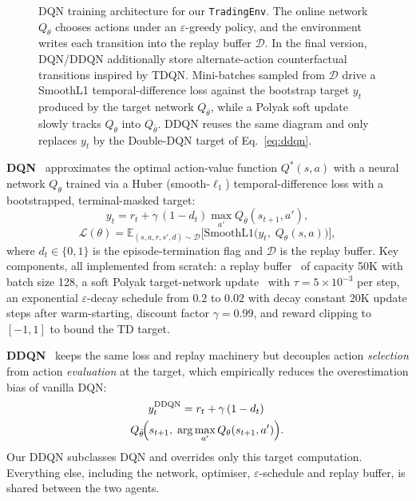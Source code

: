 \documentclass[11pt,twocolumn]{article}
\begin{document}
\begin{figure}[t]
\caption{DQN training architecture for our \texttt{TradingEnv}. The online network $Q_\theta$ chooses actions under an $\varepsilon$-greedy policy, and the environment writes each transition into the replay buffer $\mathcal{D}$. In the final version, DQN/DDQN additionally store alternate-action counterfactual transitions inspired by TDQN. Mini-batches sampled from $\mathcal{D}$ drive a SmoothL1 temporal-difference loss against the bootstrap target $y_t$ produced by the target network $Q_{\bar\theta}$, while a Polyak soft update slowly tracks $Q_\theta$ into $Q_{\bar\theta}$. DDQN reuses the same diagram and only replaces $y_t$ by the Double-DQN target of Eq.~\ref{eq:ddqn}.}
\label{fig:architecture}
\end{figure}

\textbf{DQN}~\cite{mnih2015} approximates the optimal action-value function $Q^*(s,a)$ with a neural network $Q_\theta$ trained via a Huber (smooth-$\ell_1$) temporal-difference loss with a bootstrapped, terminal-masked target:
\begin{equation}
  y_t = r_t + \gamma\,(1-d_t)\max_{a'} Q_{\bar\theta}(s_{t+1}, a'),
\end{equation}
\begin{equation}
  \mathcal{L}(\theta) = \mathbb{E}_{(s,a,r,s',d)\sim\mathcal{D}}\!\Big[\text{SmoothL1}\!\big(y_t,\; Q_\theta(s,a)\big)\Big],
  \label{eq:dqn}
\end{equation}
where $d_t\in\{0,1\}$ is the episode-termination flag and $\mathcal{D}$ is the replay buffer.
Key components, all implemented from scratch: a replay buffer~\cite{lin1992} of capacity 50K with batch size 128, a soft Polyak target-network update~\cite{polyak1992} with $\tau = 5\!\times\!10^{-3}$ per step, an exponential $\varepsilon$-decay schedule from $0.2$ to $0.02$ with decay constant 20K update steps after warm-starting, discount factor $\gamma = 0.99$, and reward clipping to $[-1,1]$ to bound the TD target.

\textbf{DDQN}~\cite{hasselt2016} keeps the same loss and replay machinery but decouples action \emph{selection} from action \emph{evaluation} at the target, which empirically reduces the overestimation bias of vanilla DQN:
\begin{multline}
  y_t^{\text{DDQN}} = r_t + \gamma\,(1-d_t)\,\\
  Q_{\bar\theta}\!\Bigl(s_{t+1},\; \arg\max_{a'} Q_\theta(s_{t+1}, a')\Bigr).
  \label{eq:ddqn}
\end{multline}
Our DDQN subclasses DQN and overrides only this target computation. Everything else, including the network, optimiser, $\varepsilon$-schedule and replay buffer, is shared between the two agents.
\end{document}
